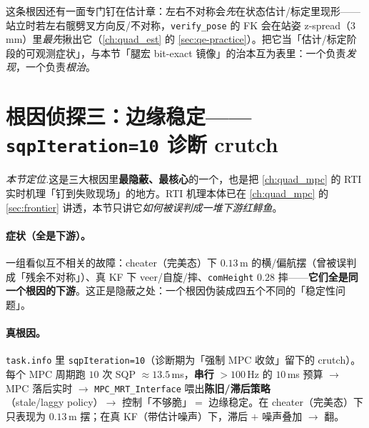 \begin{note}
这条根因还有一面专门钉在估计章：左右不对称会\emph{先}在状态估计/标定里现形——站立时若左右髋劈叉方向反/不对称，\texttt{verify\_pose} 的 FK 会在站姿 z-spread（$3$\,mm）里\emph{最先}揪出它（\cref{ch:quad_est} 的 \cref{sec:qe-practice}）。把它当「估计/标定阶段的可观测症状」，与本节「腿宏 bit-exact 镜像」的治本互为表里：一个负责\emph{发现}，一个负责\emph{根治}。
\end{note}

\section{根因侦探三：边缘稳定——\texttt{sqpIteration=10} 诊断 crutch}
\label{sec:qadv-rc3}

\noindent\emph{本节定位.}\;这是三大根因里\textbf{最隐蔽、最核心}的一个，也是把 \cref{ch:quad_mpc} 的 RTI 实时机理「钉到失败现场」的地方。RTI 机理本体已在 \cref{ch:quad_mpc} 的 \cref{sec:frontier} 讲透，本节只讲它\emph{如何被误判成一堆下游红鲱鱼}。

\paragraph{症状（全是下游）。}
一组看似互不相关的故障：cheater（完美态）下 $0.13$\,m 的横/偏航摆（曾被误判成「残余不对称」）、真 KF 下 veer/自旋/摔、\texttt{comHeight} $0.28$ 摔——\textbf{它们全是同一个根因的下游}。这正是隐蔽之处：一个根因伪装成四五个不同的「稳定性问题」。

\paragraph{真根因。}
\texttt{task.info} 里 \texttt{sqpIteration=10}（诊断期为「强制 MPC 收敛」留下的 crutch）。每个 MPC 周期跑 $10$ 次 SQP $\approx13.5$\,ms，\textbf{串行} $>100$\,Hz 的 $10$\,ms 预算 $\to$ MPC 落后实时 $\to$ \texttt{MPC\_MRT\_Interface} 喂出\textbf{陈旧/滞后策略}（stale/laggy policy）$\to$ 控制「不够脆」$=$ 边缘稳定。在 cheater（完美态）下只表现为 $0.13$\,m 摆；在真 KF（带估计噪声）下，滞后 $+$ 噪声叠加 $\to$ 翻。

